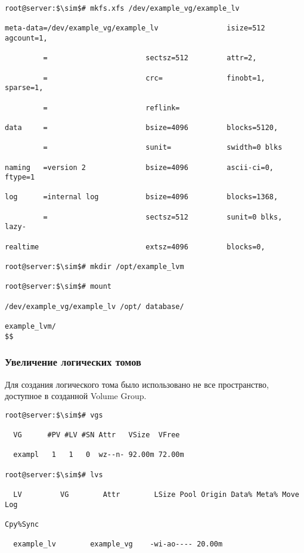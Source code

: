 \documentclass[14pt, a4paper]{article}
\begin{document}
\begin{lstlisting}[mathescape=true]
root@server:$\sim$# mkfs.xfs /dev/example_vg/example_lv

meta-data=/dev/example_vg/example_lv                isize=512 agcount=1,

         =                       sectsz=512         attr=2,

         =                       crc=               finobt=1, sparse=1,

         =                       reflink=

data     =                       bsize=4096         blocks=5120,

         =                       sunit=             swidth=0 blks

naming   =version 2              bsize=4096         ascii-ci=0, ftype=1

log      =internal log           bsize=4096         blocks=1368,

         =                       sectsz=512         sunit=0 blks, lazy-
         
realtime                         extsz=4096         blocks=0,

root@server:$\sim$# mkdir /opt/example_lvm

root@server:$\sim$# mount

/dev/example_vg/example_lv /opt/ database/

example_lvm/
$$
\end{lstlisting}

\subsubsection*{Увеличение логических томов} 

Для создания логического тома было использовано не все пространство, доступное в созданной
Volume Group.
\vspace{0.3cm}

\begin{lstlisting}[mathescape=true]
root@server:$\sim$# vgs

  VG      #PV #LV #SN Attr   VSize  VFree

  exampl   1   1   0  wz--n- 92.00m 72.00m

root@server:$\sim$# lvs

  LV         VG        Attr        LSize Pool Origin Data% Meta% Move Log

Cpy%Sync

  example_lv        example_vg    -wi-ao---- 20.00m

\end{lstlisting}
\vspace{0.2cm}
\end{document}
